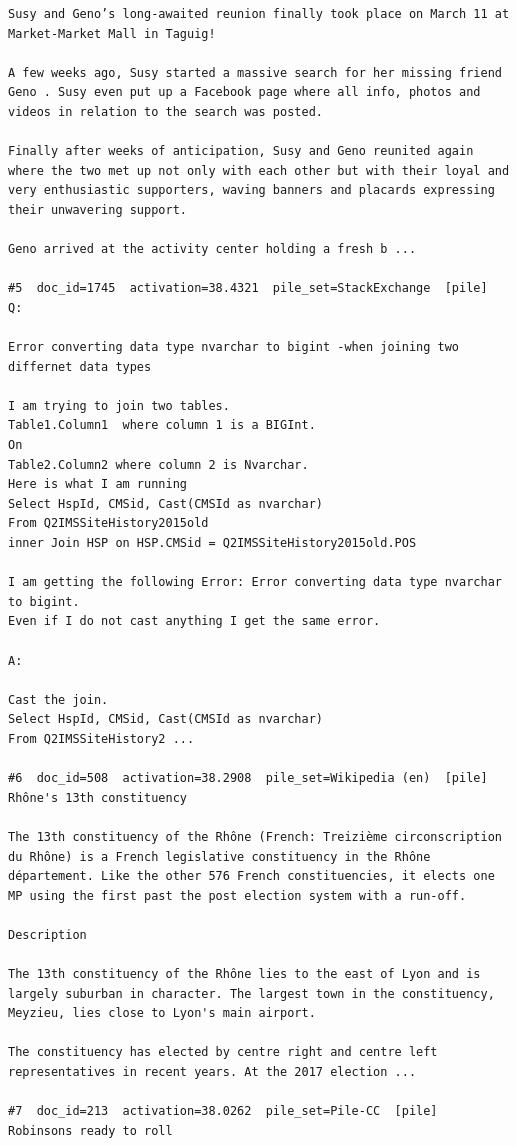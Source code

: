 \begin{verbatim}
Susy and Geno’s long-awaited reunion finally took place on March 11 at Market-Market Mall in Taguig!

A few weeks ago, Susy started a massive search for her missing friend Geno . Susy even put up a Facebook page where all info, photos and videos in relation to the search was posted.

Finally after weeks of anticipation, Susy and Geno reunited again where the two met up not only with each other but with their loyal and very enthusiastic supporters, waving banners and placards expressing their unwavering support.

Geno arrived at the activity center holding a fresh b ...

#5  doc_id=1745  activation=38.4321  pile_set=StackExchange  [pile]
Q:

Error converting data type nvarchar to bigint -when joining two differnet data types

I am trying to join two tables.  
Table1.Column1  where column 1 is a BIGInt. 
On
Table2.Column2 where column 2 is Nvarchar.  
Here is what I am running 
Select HspId, CMSid, Cast(CMSId as nvarchar)
From Q2IMSSiteHistory2015old
inner Join HSP on HSP.CMSid = Q2IMSSiteHistory2015old.POS

I am getting the following Error: Error converting data type nvarchar to bigint.
Even if I do not cast anything I get the same error.  

A:

Cast the join.
Select HspId, CMSid, Cast(CMSId as nvarchar)
From Q2IMSSiteHistory2 ...

#6  doc_id=508  activation=38.2908  pile_set=Wikipedia (en)  [pile]
Rhône's 13th constituency

The 13th constituency of the Rhône (French: Treizième circonscription du Rhône) is a French legislative constituency in the Rhône département. Like the other 576 French constituencies, it elects one MP using the first past the post election system with a run-off.

Description

The 13th constituency of the Rhône lies to the east of Lyon and is largely suburban in character. The largest town in the constituency, Meyzieu, lies close to Lyon's main airport.

The constituency has elected by centre right and centre left representatives in recent years. At the 2017 election ...

#7  doc_id=213  activation=38.0262  pile_set=Pile-CC  [pile]
Robinsons ready to roll


\end{verbatim}
